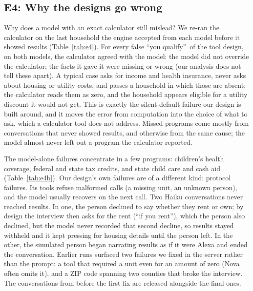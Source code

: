 \documentclass[11pt]{article}
\newcommand{\fq}{false ``you qualify''}
\begin{document}
\subsection{E4: Why the designs go wrong}
\begin{table}[t]\centering\small
\resizebox{\linewidth}{!}{}
\caption{E4: each wrong program of the tool design, traced by re-running the calculator on the last household the engine accepted from the model before it showed results.}
\label{tab:e4}
\end{table}
\begin{table}[t]\centering\small
\resizebox{\linewidth}{!}{}
\caption{E4: conversations that never reached results, tool calls the server refused, and the programs most often wrongly shown as ``you qualify''.}
\label{tab:e4b}
\end{table}
Why does a model with an exact calculator still mislead? We re-ran the calculator on the last household the engine accepted from each model before it showed results (Table~\ref{tab:e4}). For every \fq\ of the tool design, on both models, the calculator agreed with the model: the model did not override the calculator; the facts it gave it were missing or wrong (our analysis does not tell these apart). A typical case asks for income and health insurance, never asks about housing or utility costs, and passes a household in which those are absent; the calculator reads them as zero, and the household appears eligible for a utility discount it would not get. This is exactly the silent-default failure our design is built around, and it moves the error from computation into the choice of what to ask, which a calculator tool does not address. Missed programs come mostly from conversations that never showed results, and otherwise from the same cause; the model almost never left out a program the calculator reported.

The model-alone failures concentrate in a few programs: children's health coverage, federal and state tax credits, and state child care and cash aid (Table~\ref{tab:e4b}). Our design's own failures are of a different kind: protocol failures. Its tools refuse malformed calls (a missing unit, an unknown person), and the model usually recovers on the next call. Two Haiku conversations never reached results. In one, the person declined to say whether they rent or own; by design the interview then asks for the rent (``if you rent''), which the person also declined, but the model never recorded that second decline, so results stayed withheld and it kept pressing for housing details until the person left. In the other, the simulated person began narrating results as if it were Alexa and ended the conversation. Earlier runs surfaced two failures we fixed in the server rather than the prompt: a tool that required a unit even for an amount of zero (Nova often omits it), and a ZIP code spanning two counties that broke the interview. The conversations from before the first fix are released alongside the final ones.
\end{document}
